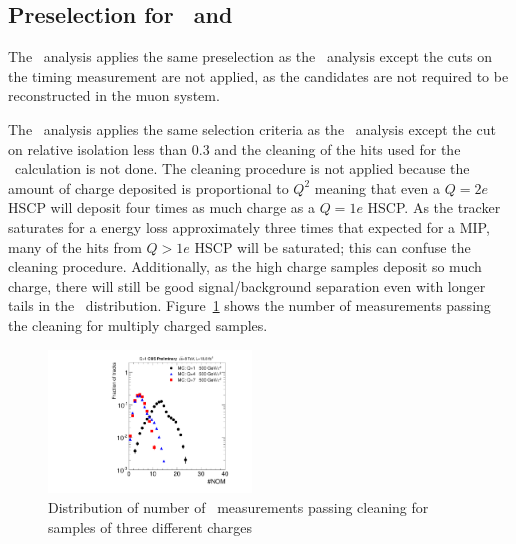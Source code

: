 \subsection{Preselection for \tkonly\ and \multi\ \label{sec:otherpreselection}}

The \tkonly\ analysis applies the same preselection as the \tktof\ analysis except the cuts on the timing measurement are not applied, as the candidates
are not required to be reconstructed in the muon system. 

The \multi\ analysis applies
the same selection criteria as the \tktof\ analysis except the cut on relative isolation less than 0.3 and the cleaning of the hits used for the \dedx\ calculation
is not done. The cleaning procedure is not applied because the amount of charge deposited is proportional to $Q^2$ meaning that even a $Q=2e$ HSCP will
deposit four times as much charge as a $Q=1e$ HSCP. As the tracker saturates for a energy loss approximately three times that expected for a MIP, many of the hits from $Q>1e$ HSCP
will be saturated; this can confuse the cleaning procedure. Additionally, as the high charge samples deposit so much charge, 
there will still be good signal/background separation even with longer tails in the \dedx\ distribution.
Figure~\ref{fig:Multi} shows the number of measurements passing the cleaning for multiply charged samples.

\begin{figure}
\centering
  \includegraphics[clip=false, trim=0.0cm 0cm 0.0cm 0cm, width=0.48\textwidth]{figures/multi/Selection_Comp_8TeV_DY_QG_NOM_BS}
  \caption{Distribution of number of \dedx\ measurements passing cleaning for samples of three different charges
    \label{fig:Multi}}
\end{figure}

